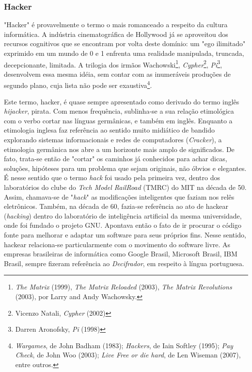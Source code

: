 \subsubsection{Hacker} \label{2.1.1.a}

"Hacker" é provavelmente o termo o mais romanceado a respeito da cultura informática. A indústria cinematográfica de Hollywood já se aproveitou dos recursos cognitivos que se encontram por volta deste domínio: um "ego ilimitado" exprimido em um mundo de 0 e 1 enfrenta uma realidade manipulada, truncada, decepcionante, limitada. A trilogia dos irmãos Wachowski\footnote{\emph{The Matrix} (1999), \emph{The Matrix Reloaded} (2003), \emph{The Matrix Revolutions} (2003), por Larry and Andy Wachowsky.}, \emph{Cypher}\footnote{Vicenzo Natali, \emph{Cypher} (2002)}, \emph{Pi}\footnote{Darren Aronofsky, \emph{Pi} (1998)}, desenvolvem essa mesma idéia, sem contar com as inumeráveis produções de segundo plano, cuja lista não pode ser exaustiva\footnote{\emph{Wargames}, de John Badham (1983); \emph{Hackers}, de Iain Softley (1995); \emph{Pay Check}, de John Woo (2003); \emph{Live Free or die hard}, de Len Wiseman (2007), entre outros.}.

Este termo, hacker, é quase sempre apresentado como derivado do termo inglês \emph{hijacker}, pirata. Com menos frequência, sublinha-se a sua relação etimológica com o verbo cortar nas línguas germânicas, e também em inglês. Enquanto a etimologia inglesa faz referência ao sentido muito midiático de bandido explorando sistemas informacionais e redes de computadores (\emph{Cracker}), a etimologia germânica nos abre a um horizonte mais amplo de significados. De fato, trata-se então de "cortar" os caminhos já conhecidos para achar dicas, soluções, hipóteses para um problema que sejam originais, não óbvios e elegantes. É nesse sentido que o termo \emph{hack} foi usado pela primeira vez, dentro dos laboratórios do clube do \emph{Tech Model RailRoad} (TMRC) do MIT na década de 50. Assim, chamava-se de "\emph{hack}" as modificações inteligentes que faziam nos relês eletrônicos. Também, na década de 60, fazia-se referência ao ato de hackear (\emph{hacking}) dentro do laboratório de inteligência artificial da mesma universidade, onde foi fundado o projeto GNU. Apontava então o fato de ir procurar o código fonte para melhorar e adaptar um software para seus próprios fins. Nesse sentido, hackear relaciona-se particularmente com o movimento do software livre. As empresas brasileiras de informática como Google Brasil, Microsoft Brasil, IBM Brasil, sempre fizeram referência ao \emph{Decifrador}, em respeito à língua portuguesa. 

